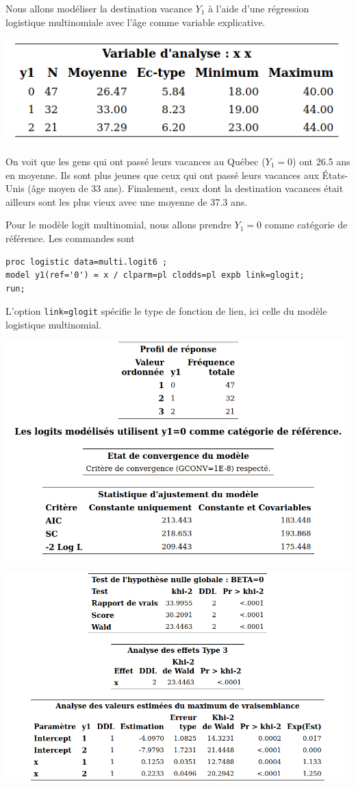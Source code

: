 \documentclass[
  11pt,
  letterpaper,
]{book}
\theoremstyle{definition}
\theoremstyle{definition}
\theoremstyle{definition}
\theoremstyle{remark}
\begin{document}
Nous allons modéliser la destination vacance \(Y_1\) à l'aide d'une régression logistique multinomiale avec l'âge comme variable explicative.

\begin{center}\includegraphics[width=0.5\linewidth]{figures/03-logistic-e31} \end{center}

On voit que les gens qui ont passé leurs vacances au Québec (\(Y_1=0\)) ont 26.5 ans en moyenne. Ils sont plus jeunes que ceux qui ont passé leurs vacances aux États-Unis (âge moyen de 33 ans). Finalement, ceux dont la destination vacances était ailleurs sont les plus vieux avec une moyenne de 37.3 ans.

Pour le modèle logit multinomial, nous allons prendre \(Y_1=0\) comme catégorie de référence. Les commandes sont

\begin{verbatim}
proc logistic data=multi.logit6 ;
model y1(ref='0') = x / clparm=pl clodds=pl expb link=glogit;
run; 
\end{verbatim}

L'option \texttt{link=glogit} spécifie le type de fonction de lien, ici celle du modèle logistique multinomial.

\begin{center}\includegraphics[width=0.75\linewidth]{figures/03-logistic-e23} \end{center}

\begin{center}\includegraphics[width=0.8\linewidth]{figures/03-logistic-e24} \end{center}
\end{document}
